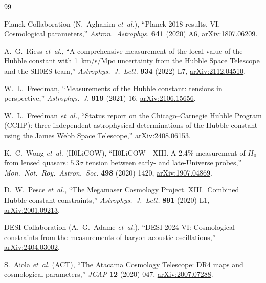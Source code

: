 \documentclass[11pt,a4paper]{article}
\theoremstyle{plain}
\theoremstyle{definition}
\theoremstyle{remark}
\begin{document}
\begin{thebibliography}{99}

Planck Collaboration (N.~Aghanim \textit{et~al.}),
``Planck 2018 results. VI. Cosmological parameters,''
\emph{Astron.\ Astrophys.} \textbf{641} (2020) A6,
\href{https://arxiv.org/abs/1807.06209}{arXiv:1807.06209}.

A.~G.~Riess \textit{et~al.},
``A comprehensive measurement of the local value of the Hubble constant
with 1~km/s/Mpc uncertainty from the Hubble Space Telescope and the
SH0ES team,''
\emph{Astrophys.\ J.\ Lett.} \textbf{934} (2022) L7,
\href{https://arxiv.org/abs/2112.04510}{arXiv:2112.04510}.

W.~L.~Freedman,
``Measurements of the Hubble constant: tensions in perspective,''
\emph{Astrophys.\ J.} \textbf{919} (2021) 16,
\href{https://arxiv.org/abs/2106.15656}{arXiv:2106.15656}.

W.~L.~Freedman \textit{et~al.},
``Status report on the Chicago--Carnegie Hubble Program (CCHP):
three independent astrophysical determinations of the Hubble constant
using the James Webb Space Telescope,''
\href{https://arxiv.org/abs/2408.06153}{arXiv:2408.06153}.

K.~C.~Wong \textit{et~al.} (H0LiCOW),
``H0LiCOW---XIII. A 2.4\% measurement of $H_0$ from lensed quasars:
$5.3\sigma$ tension between early- and late-Universe probes,''
\emph{Mon.\ Not.\ Roy.\ Astron.\ Soc.} \textbf{498} (2020) 1420,
\href{https://arxiv.org/abs/1907.04869}{arXiv:1907.04869}.

D.~W.~Pesce \textit{et~al.},
``The Megamaser Cosmology Project. XIII.\ Combined Hubble constant
constraints,''
\emph{Astrophys.\ J.\ Lett.} \textbf{891} (2020) L1,
\href{https://arxiv.org/abs/2001.09213}{arXiv:2001.09213}.

DESI Collaboration (A.~G.~Adame \textit{et~al.}),
``DESI 2024 VI: Cosmological constraints from the measurements of
baryon acoustic oscillations,''
\href{https://arxiv.org/abs/2404.03002}{arXiv:2404.03002}.

S.~Aiola \textit{et~al.} (ACT),
``The Atacama Cosmology Telescope: DR4 maps and cosmological parameters,''
\emph{JCAP} \textbf{12} (2020) 047,
\href{https://arxiv.org/abs/2007.07288}{arXiv:2007.07288}.


\end{thebibliography}
\end{document}

